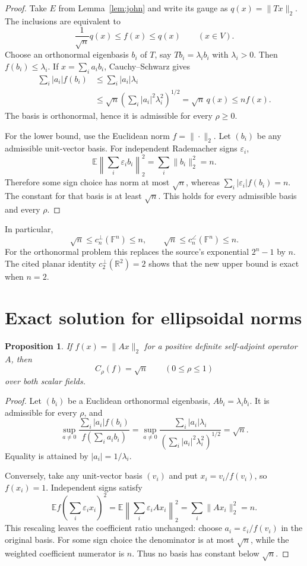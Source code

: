 \documentclass[11pt]{article}
\newtheorem{proposition}{Proposition}
\newcommand{\F}{\mathbb F}
\newcommand{\R}{\mathbb R}
\begin{document}
\begin{proof}
Take $E$ from Lemma~\ref{lem:john} and write its gauge as
$q(x)=\|Tx\|_2$.  The inclusions are equivalent to
\[
 \frac1{\sqrt n}q(x)\le f(x)\le q(x)\qquad(x\in V).
\]
Choose an orthonormal eigenbasis $b_i$ of $T$, say $Tb_i=\lambda_i b_i$
with $\lambda_i>0$.  Then $f(b_i)\le\lambda_i$.  If
$x=\sum_i a_i b_i$, Cauchy--Schwarz gives
\begin{align*}
 \sum_i|a_i|f(b_i)
 &\le\sum_i|a_i|\lambda_i\\
 &\le\sqrt n\left(\sum_i|a_i|^2\lambda_i^2\right)^{1/2}
 =\sqrt n\,q(x)
 \le n f(x).
\end{align*}
The basis is orthonormal, hence it is admissible for every $\rho\ge0$.

For the lower bound, use the Euclidean norm $f=\|\cdot\|_2$.  Let
$(b_i)$ be any admissible unit-vector basis.  For independent Rademacher
signs $\varepsilon_i$,
\[
 \mathbb E\left\|\sum_i\varepsilon_i b_i\right\|_2^2
 =\sum_i\|b_i\|_2^2=n.
\]
Therefore some sign choice has norm at most $\sqrt n$, whereas
$\sum_i|\varepsilon_i|f(b_i)=n$.  The constant for that basis is at least
$\sqrt n$.  This holds for every admissible basis and every $\rho$.
\end{proof}

In particular,
\[
 \sqrt n\le c_n^\perp(\F^n)\le n,
 \qquad
 \sqrt n\le c_n^\angle(\F^n)\le n.
\]
For the orthonormal problem this replaces the source's exponential
$2^n-1$ by $n$.  The cited planar identity
$c_2^\perp(\R^2)=2$ shows that the new upper bound is exact when $n=2$.

\section{Exact solution for ellipsoidal norms}

\begin{proposition}\label{prop:ellipsoid}
If $f(x)=\|Ax\|_2$ for a positive definite self-adjoint operator $A$, then
\[
 C_\rho(f)=\sqrt n\qquad(0\le\rho\le1)
\]
over both scalar fields.
\end{proposition}

\begin{proof}
Let $(b_i)$ be a Euclidean orthonormal eigenbasis,
$Ab_i=\lambda_i b_i$.  It is admissible for every $\rho$, and
\[
 \sup_{a\ne0}
 \frac{\sum_i|a_i|f(b_i)}{f(\sum_i a_i b_i)}
 =\sup_{a\ne0}
 \frac{\sum_i|a_i|\lambda_i}
 {(\sum_i|a_i|^2\lambda_i^2)^{1/2}}
 =\sqrt n.
\]
Equality is attained by $|a_i|=1/\lambda_i$.

Conversely, take any unit-vector basis $(v_i)$ and put
$x_i=v_i/f(v_i)$, so $f(x_i)=1$.  Independent signs satisfy
\[
 \mathbb E f\!\left(\sum_i\varepsilon_i x_i\right)^2
 =\mathbb E\left\|\sum_i\varepsilon_i Ax_i\right\|_2^2
 =\sum_i\|Ax_i\|_2^2=n.
\]
This rescaling leaves the coefficient ratio unchanged: choose
$a_i=\varepsilon_i/f(v_i)$ in the original basis.
For some sign choice the denominator is at most $\sqrt n$, while the
weighted coefficient numerator is $n$.  Thus no basis has constant below
$\sqrt n$.
\end{proof}
\end{document}
